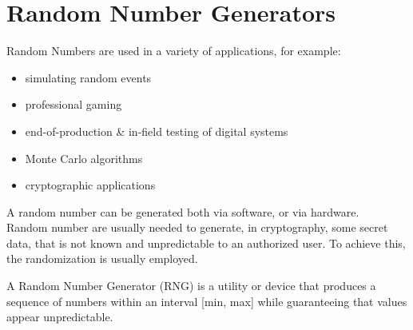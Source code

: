 \chapter{Random Number Generators}
Random Numbers are used in a variety of applications, for example:
\begin{itemize}
  \item simulating random events
  \item professional gaming
  \item end-of-production & in-field testing of digital systems
  \item Monte Carlo algorithms
  \item cryptographic applications
\end{itemize}
A random number can be generated both via software, or via hardware.\\
Random number are usually needed to generate, in cryptography, some secret data, that is not known 
and unpredictable to an authorized user. To achieve this, the randomization is usually employed.

\begin{boxH}
  A Random Number Generator (RNG) is a utility or device that produces a sequence of numbers 
  within an interval [min, max] while guaranteeing that values appear unpredictable.
\end{boxH}

